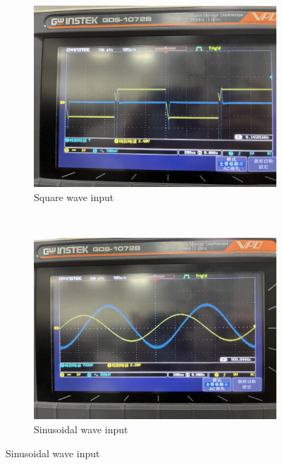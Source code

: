 \documentclass{article}
\begin{document}
\begin{CJK*}{UTF8}{bkai}
\begin{figure}[h]
\begin{center}
        \begin{subfigure}[b]{0.3\textwidth}
            \includegraphics[width=\textwidth]{diff_square.jpg}
            \caption{Square wave input}
        \end{subfigure}
        ~
        \begin{subfigure}[b]{0.3\textwidth}
            \includegraphics[width=\textwidth]{diff_sin.jpg}
            \caption{Sinusoidal wave input}
        \end{subfigure}
    \end{center}   
    \end{figure}
    

\end{CJK*}
\end{document}
